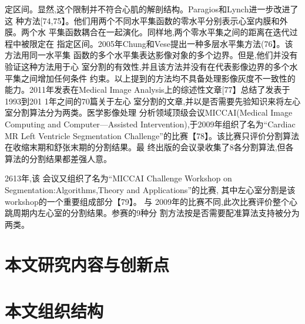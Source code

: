 定区间。显然,这个限制并不符合心肌的解剖结构。Paragios和Lynch进一步改进了这
种方法[74,75】。他们用两个不同水平集函数的零水平分别表示心室内膜和外膜。两个水
平集函数耦合在一起演化。同样地,两个零水平集之间的距离在迭代过程中被限定在
指定区间。2005年Chung和Vese提出一种多层水平集方法(76】。该方法用同一水平集
函数的多个水平集表达影像对象的多个边界。但是,他们并没有验证这种方法用于心
室分割的有效性,并且该方法并没有在代表影像边界的多个水平集之间增加任何条件
约束。以上提到的方法均不具备处理影像灰度不一致性的能力。2011年发表在Medical
Image
 Analysis上的综述性文章[77】总结了发表于1993到201 1年之间的70篇关于左心
 室分割的文章,并以是否需要先验知识来将左心室分割算法分为两类。医学影像处理
 分析领域顶级会议MICCAI(Medical
  Image Computing
   and Computer—Assisted
   Intervention),于2009年组织了名为“Cardiac MR
    Left
     Ventricle Segmentation
     Challenge”的比赛【78】。该比赛只评价分割算法在收缩末期和舒张末期的分割结果。最
     终出版的会议录收集了8各分割算法,但各算法的分割结果都差强人意。
     
2613年,该
会议又组织了名为“MICCAI
Challenge Workshop on Segmentation:Algorithms,Theory and Applications”的比赛,
其中左心室分割是该workshop的一个重要组成部分【79】。
与 2009年的比赛不同,此次比赛评价整个心跳周期内左心室的分割结果。参赛的9种分
割方法按是否需要配准算法支持被分为两类。

\section{本文研究内容与创新点}

\section{本文组织结构}
